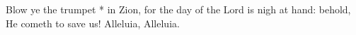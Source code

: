 Blow ye the trumpet * in Zion, for the day of the Lord is nigh at hand: behold, He cometh to save us! Alleluia, Alleluia.